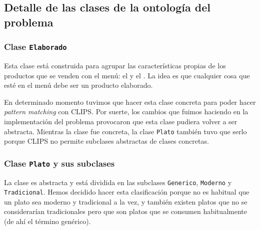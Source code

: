 \subsection{Detalle de las clases de la ontología del problema}
\subsubsection{Clase \texttt{Elaborado}}
Esta clase está construida para agrupar las características propias de los
productos que se venden con el menú: el  y el
. La idea es que cualquier cosa que esté en el menú debe ser un
producto elaborado.

En determinado momento tuvimos que hacer esta clase concreta para poder hacer
\emph{pattern matching} con CLIPS. Por suerte, los cambios que fuimos haciendo
en la implementación del problema provocaron que esta clase pudiera volver a
ser abstracta. Mientras la clase fue concreta, la clase \verb+Plato+ también
tuvo que serlo porque CLIPS no permite subclases abstractas de clases
concretas.

\subsubsection{Clase \texttt{Plato} y sus subclases}
La clase es abstracta y está dividida en las subclases \verb+Generico+,
\verb+Moderno+ y \verb+Tradicional+. Hemos decidido hacer esta clasificación
porque no es habitual que un plato sea moderno y tradicional a la vez, y
también existen platos que no se considerarían tradicionales pero que son
platos que se consumen habitualmente (de ahí el término genérico).

